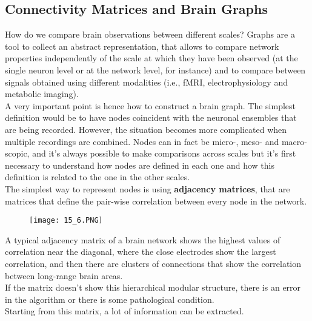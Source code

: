 \subsection{Connectivity Matrices and Brain Graphs}
How do we compare brain observations between different scales? Graphs are a tool to collect an abstract representation, that allows to compare network properties independently of the scale at which they have been observed (at the single neuron level or at the network level, for instance) and to compare between signals obtained using different modalities (i.e., fMRI, electrophysiology and metabolic imaging).\\
A very important point is hence how to construct a brain graph. The simplest definition would be to have nodes coincident with the neuronal ensembles that are being recorded. However, the situation becomes more complicated when multiple recordings are combined. Nodes can in fact be micro-, meso- and macro-scopic, and it's always possible to make comparisons across scales but it's first necessary to understand how nodes are defined in each one and how this definition is related to the one in the other scales.\\
The simplest way to represent nodes is using \textbf{adjacency matrices}, that are matrices that define the pair-wise correlation between every node in the network.
\begin{figure}[H]
    \centering
    \texttt{[image: 15\_6.PNG]}
\end{figure}
A typical adjacency matrix of a brain network shows the highest values of correlation near the diagonal, where the close electrodes show the largest correlation, and then there are clusters of connections that show the correlation between long-range brain areas.\\
If the matrix doesn't show this hierarchical modular structure, there is an error in the algorithm or there is some pathological condition.\\
Starting from this matrix, a lot of information can be extracted.
